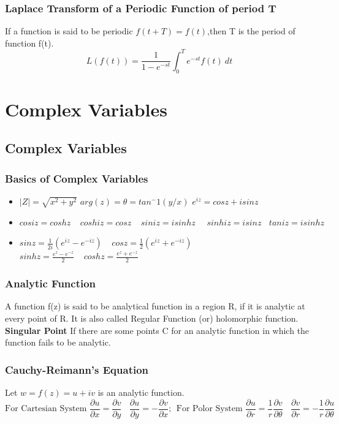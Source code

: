 \subsection*{Laplace Transform of a Periodic Function of period T}
If a function is said to be periodic \(f(t+T)=f(t)\),then T is the period of function f(t).
\[L\left(f(t)\right)=\frac{1}{1-e^{-st}}\int_0^Te^{-st}f(t)\ dt\]


\chapter*{Complex Variables}
\section{Complex Variables}

\subsection{Basics of Complex Variables}
\begin{itemize}
    \item \(|Z|=\sqrt{x^2+y^2}\)\hspace{1cm} \(arg(z)=\theta=tan^-1(y/x)\)\hspace{1cm} \(e^{iz} = cosz + i sinz\)
    \item \(cosiz = coshz\ \ \ \ \ coshiz=cosz\ \ \ \ \ siniz=isinhz\ \ \ \ \ \ sinhiz=isinz\ \ \ \ taniz=isinhz\)
    \item \(sinz=\frac{1}{2i}(e^{iz}-e^{-iz})\ \ \ \ \ cosz=\frac{1}{2}(e^{iz}+e^{-iz})\)\hspace{1cm} \(sinhz=\frac{e^{z}-e^{-z}}{2}\ \ \ \ \ coshz=\frac{e^{z}+e^{-z}}{2}\)
\end{itemize}

\subsection*{Analytic Function}
A function f(z) is said to be analytical function in a region R, if it is analytic at every point of R. It is also called Regular Function (or) holomorphic function.\\

\textbf{Singular Point}
If there are some points C for an analytic function in which the function fails to be analytic.

\subsection*{Cauchy-Reimann's Equation}
Let \(w=f(z)=u+iv\) is an analytic function.
\[\text{For Cartesian System }\frac{\partial u}{\partial x}=\frac{\partial v}{\partial y}\ \ \ \ \frac{\partial u}{\partial y}=-\frac{\partial v}{\partial x};\ \ \text{For Polor System } \frac{\partial u}{\partial r}=\frac{1}{r}\frac{\partial v}{\partial \theta}\ \ \ \ \frac{\partial v}{\partial r}=-\frac{1}{r}\frac{\partial u}{\partial \theta} \]

